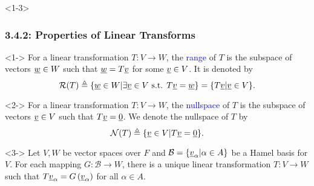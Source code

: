 \documentclass[10pt,english,aspectratio=169]{beamer}
\begin{document}
\begin{frame}<1-3> \frametitle{3.4.2: Properties of Linear Transforms}

\vspace{-1mm}

\begin{definition}[Range]<1->
For a linear transformation $T\colon V \to W$, the \textcolor{blue}{range} of $T$ is the subspace of vectors $\underline{w} \in W$ such that $\underline{w} = T \underline{v}$ for some $\underline{v} \in V$.
It is denoted by \vspace{-2mm}
\[ \mathcal{R}(T) \triangleq \{ \underline{w}\in W | \exists \underline{v}\in V \textrm{ s.t. } T\underline{v} = \underline{w} \} = \{ T \underline{v} | \underline{v} \in V\}. \]
\end{definition}

\vspace{-1mm}

\begin{definition}[Nullspace]<2->
For a linear transformation $T\colon V \to W$, the \textcolor{blue}{nullspace} of $T$ is the subspace of vectors $\underline{v} \in V$ such that $T \underline{v} = \underline{0}$.
We denote the nullspace of $T$ by \vspace{-2mm}
\[ \mathcal{N}(T) \triangleq \{ \underline{v}\in V | T \underline{v} = \underline{0} \} .\]
\end{definition}

\vspace{-1mm}

\begin{theorem}<3->
Let $V,W$ be vector spaces over $F$ and $\mathcal{B} = \{ \underline{v}_{\alpha} | \alpha \in A \}$ be a Hamel basis for $V$.
For each mapping $G \colon \mathcal{B} \rightarrow W$, there is a unique linear transformation $T \colon V \rightarrow W$ such that $T \underline{v}_{\alpha} = G \left( \underline{v}_{\alpha} \right)$ for all $\alpha \in A$.
\end{theorem}

\vspace{-0.5mm}



\end{frame}
\end{document}

